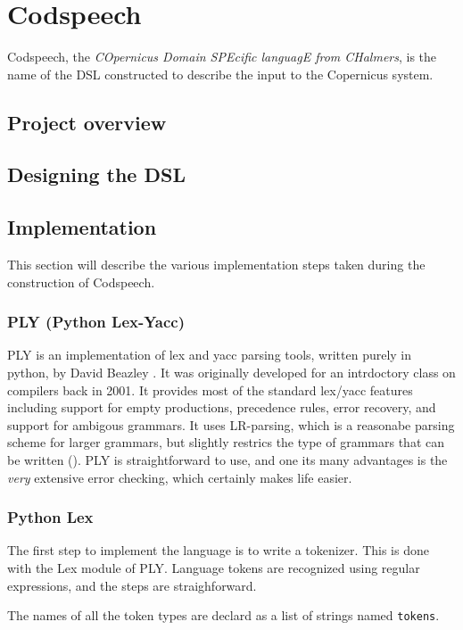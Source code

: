 \chapter{Codspeech}
Codspeech, the \emph{COpernicus Domain SPEcific languagE from
  CHalmers}, is the name of the DSL constructed to describe the input
to the Copernicus system.


\section{Project overview}


\section{Designing the DSL}


\section{Implementation}
This section will describe the various implementation steps taken
during the construction of Codspeech.


\subsection{PLY (Python Lex-Yacc)}\label{sec:ply}
PLY is an implementation of lex and yacc parsing tools, written purely
in python, by David Beazley \citep{ply:online}. It was originally
developed for an intrdoctory class on compilers back in 2001. It
provides most of the standard lex/yacc features including support for
empty productions, precedence rules, error recovery, and support for
ambigous grammars. It uses LR-parsing, which is a reasonabe parsing
scheme for larger grammars, but slightly restrics the type of grammars
that can be written (). PLY is
straightforward to use, and one its many advantages is the \emph{very}
extensive error checking, which certainly makes life easier.

\subsection{Python Lex}
The first step to implement the language is to write a tokenizer. This
is done with the Lex module of PLY. Language tokens are recognized
using regular expressions, and the steps are straighforward.

The names of all the token types are declard as a list of strings
named \texttt{tokens}.


